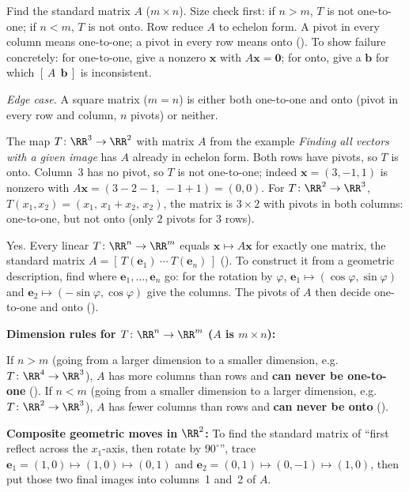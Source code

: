\documentclass[10pt]{scrartcl}
\newcommand{\vv}[1]{\mathbf{#1}}
\begin{document}
\begin{steps}
  \ii Find the standard matrix $A$ ($m\times n$).
  \ii Size check first: if $n>m$, $T$ is not one-to-one; if $n<m$, $T$ is not onto.
  \ii Row reduce $A$ to echelon form. A pivot in every column means one-to-one; a pivot in every row means onto ().
  \ii To show failure concretely: for one-to-one, give a nonzero $\vv x$ with $A\vv x=\vv 0$; for onto, give a $\vv b$ for which $[\,A\ \ \vv b\,]$ is inconsistent.
\end{steps}
\emph{Edge case.} A square matrix ($m=n$) is either both one-to-one and onto (pivot in every row and column, $n$ pivots) or neither.

\begin{example*}
The map $T\colon\RR^3\to\RR^2$ with matrix $A$ from the example \emph{Finding all vectors with a given image} has $A$ already in echelon form. Both rows have pivots, so $T$ is onto. Column~3 has no pivot, so $T$ is not one-to-one; indeed $\vv x=(3,-1,1)$ is nonzero with $A\vv x=(3-2-1,\ -1+1)=(0,0)$. For $T\colon\RR^2\to\RR^3$, $T(x_1,x_2)=(x_1,\,x_1+x_2,\,x_2)$, the matrix is $3\times2$ with pivots in both columns: one-to-one, but not onto (only $2$ pivots for $3$ rows).
\end{example*}

\revisit
Yes. Every linear $T\colon\RR^n\to\RR^m$ equals $\vv x\mapsto A\vv x$ for exactly one matrix, the standard matrix $A=[\,T(\vv e_1)\ \cdots\ T(\vv e_n)\,]$ (). To construct it from a geometric description, find where $\vv e_1,\dots,\vv e_n$ go: for the rotation by $\varphi$, $\vv e_1\mapsto(\cos\varphi,\sin\varphi)$ and $\vv e_2\mapsto(-\sin\varphi,\cos\varphi)$ give the columns. The pivots of $A$ then decide one-to-one and onto ().

\begin{shortcuts}
  \ii \textbf{Dimension rules for $T\colon\RR^n\to\RR^m$ ($A$ is $m\times n$):}
  \begin{itemize}
    \ii If $n>m$ (going from a larger dimension to a smaller dimension, e.g.\ $T\colon\RR^4\to\RR^3$), $A$ has more columns than rows and \textbf{can never be one-to-one} ().
    \ii If $n<m$ (going from a smaller dimension to a larger dimension, e.g.\ $T\colon\RR^2\to\RR^3$), $A$ has fewer columns than rows and \textbf{can never be onto} ().
  \end{itemize}
  \ii \textbf{Composite geometric moves in $\RR^2$:} To find the standard matrix of ``first reflect across the $x_1$-axis, then rotate by $90^\circ$'', trace $\vv e_1=(1,0)\mapsto(1,0)\mapsto(0,1)$ and $\vv e_2=(0,1)\mapsto(0,-1)\mapsto(1,0)$, then put those two final images into columns~1 and~2 of $A$.
\end{shortcuts}
\end{document}
